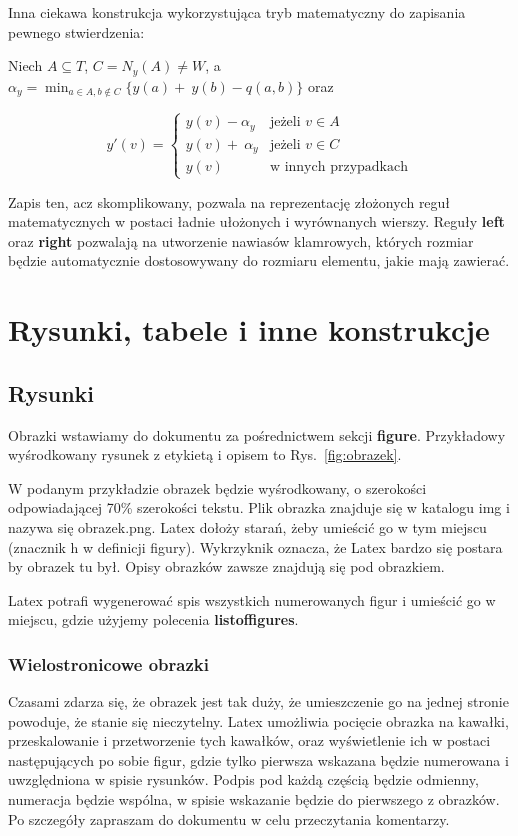 \documentclass[twoside,a4paper]{book}
\begin{document}
Inna ciekawa konstrukcja wykorzystująca tryb matematyczny do zapisania pewnego stwierdzenia:

Niech $A \subseteq T$, $C = N_y(A) \neq W$, a~$\alpha_y = \min_{a \in A, b\notin C} \{y(a) +~y(b) - q(a, b)\}$ oraz

\[ y'(v) = \left\{ \begin{array}{ll}
                y(v) - \alpha_y & \mbox{jeżeli $v \in A$} \\
                y(v) +~\alpha_y & \mbox{jeżeli $v \in C$} \\
                y(v)            & \mbox{w innych przypadkach}
               \end{array}
       \right. \]

Zapis ten, acz skomplikowany, pozwala na reprezentację złożonych reguł matematycznych w postaci ładnie ułożonych i wyrównanych wierszy. Reguły \textbf{left} oraz \textbf{right} pozwalają na utworzenie nawiasów klamrowych, których rozmiar będzie automatycznie dostosowywany do rozmiaru elementu, jakie mają zawierać.

\chapter{Rysunki, tabele i inne konstrukcje}
\enlargethispage{20pt}
\section{Rysunki}
\label{rysunki}
Obrazki wstawiamy do dokumentu za pośrednictwem sekcji \textbf{figure}. Przykładowy wyśrodkowany rysunek z etykietą i opisem to Rys.~\ref{fig:obrazek}.

W podanym przykładzie obrazek będzie wyśrodkowany, o szerokości odpowiadającej 70\% szerokości tekstu. Plik obrazka znajduje się w katalogu img i nazywa się obrazek.png. Latex dołoży starań, żeby umieścić go w tym miejscu (znacznik h w definicji figury). Wykrzyknik oznacza, że Latex bardzo się postara by obrazek tu był. Opisy obrazków zawsze znajdują się pod obrazkiem.

Latex potrafi wygenerować spis wszystkich numerowanych figur i umieścić go w miejscu, gdzie użyjemy polecenia \textbf{listoffigures}.

\subsection{Wielostronicowe obrazki}

Czasami zdarza się, że obrazek jest tak duży, że umieszczenie go na jednej stronie powoduje, że stanie się nieczytelny. Latex umożliwia pocięcie obrazka na kawałki, przeskalowanie i przetworzenie tych kawałków, oraz wyświetlenie ich w postaci następujących po sobie figur, gdzie tylko pierwsza wskazana będzie numerowana i uwzględniona w spisie rysunków. Podpis pod każdą częścią będzie odmienny, numeracja będzie wspólna, w spisie wskazanie będzie do pierwszego z obrazków. Po szczegóły zapraszam do dokumentu w celu przeczytania komentarzy.
\end{document}
